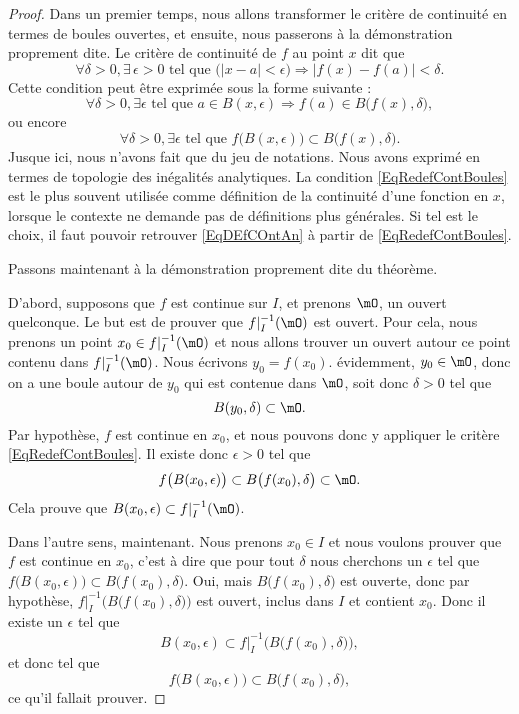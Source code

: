 \begin{proof}

Dans un premier temps, nous allons transformer le critère de continuité en termes de boules ouvertes, et ensuite, nous passerons à la démonstration proprement dite. Le critère de continuité de $f$ au point $x$ dit que
\begin{equation}        \label{EqDEfCOntAn}
  \forall \delta>0,\exists\,\epsilon>0\text{ tel que }\big( | x-a |< \epsilon \big)\Rightarrow| f(x)-f(a) |<\delta.
\end{equation}
Cette condition peut être exprimée sous la forme suivante :
\[
  \forall \delta>0,\exists\epsilon\text{ tel que } a\in B(x,\epsilon)\Rightarrow f(a)\in B\big( f(x),\delta \big),
\]
ou encore
\begin{equation}        \label{EqRedefContBoules}
  \forall \delta>0,\exists\epsilon\text{ tel que } f\big( B(x,\epsilon) \big)\subset B\big( f(x),\delta \big).
\end{equation}
Jusque ici, nous n'avons fait que du jeu de notations. Nous avons exprimé en termes de topologie des inégalités analytiques. La condition \eqref{EqRedefContBoules} est le plus souvent utilisée comme définition de la continuité d'une fonction en \( x\), lorsque le contexte ne demande pas de définitions plus générales. Si tel est le choix, il faut pouvoir retrouver \eqref{EqDEfCOntAn} à partir de \eqref{EqRedefContBoules}.

Passons maintenant à la démonstration proprement dite du théorème.

D'abord, supposons que $f$ est continue sur $I$, et prenons $\mO$, un ouvert quelconque. Le but est de prouver que $f|_I^{-1}(\mO)$ est ouvert. Pour cela, nous prenons un point $x_0\in f|_I^{-1}(\mO)$ et nous allons trouver un ouvert autour ce point contenu dans $f|_I^{-1}(\mO)$. Nous écrivons $y_0=f(x_0)$. évidemment, $y_0\in\mO$, donc on a une boule autour de $y_0$ qui est contenue dans $\mO$, soit donc $\delta>0$ tel que
\[
  B(y_0,\delta)\subset\mO.
\]
Par hypothèse, $f$ est continue en $x_0$, et nous pouvons donc y appliquer le critère \eqref{EqRedefContBoules}. Il existe donc $\epsilon>0$ tel que
\[
  f\big( B(x_0,\epsilon) \big)\subset B\big( f(x_0),\delta \big)\subset\mO.
\]
Cela prouve que $B(x_0,\epsilon)\subset f|_I^{-1}(\mO)$.

Dans l'autre sens, maintenant. Nous prenons $x_0\in I$ et nous voulons prouver que $f$ est continue en $x_0$, c'est à dire que pour tout $\delta$ nous cherchons un $\epsilon$ tel que $f\big( B(x_0,\epsilon) \big)\subset B\big( f(x_0),\delta \big)$. Oui, mais $B\big( f(x_0),\delta \big)$ est ouverte, donc par hypothèse, $f|_I^{-1}\Big( B\big( f(x_0),\delta \big) \Big)$ est ouvert, inclus dans $I$ et contient $x_0$. Donc il existe un $\epsilon$ tel que
\[
  B(x_0,\epsilon)\subset f|_I^{-1}\Big( B\big( f(x_0),\delta \big) \Big),
\]
et donc tel que
\[
  f\big( B(x_0,\epsilon) \big)\subset B\big( f(x_0),\delta \big),
\]
ce qu'il fallait prouver.
\end{proof}

